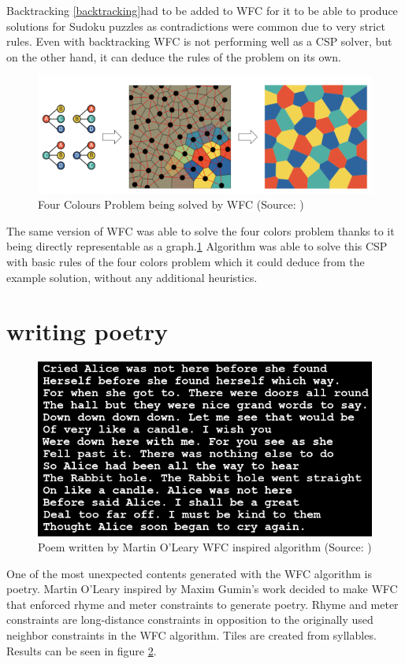 \documentclass[shortabstract, english, inz]{iithesis}
\begin{document}
Backtracking \ref{backtracking}had to be added to WFC for it to be able to produce solutions for Sudoku puzzles as contradictions were common due to very strict rules. Even with backtracking WFC is not performing well as a CSP solver, but on the other hand, it can deduce the rules of the problem on its own.\cite{GraphBased}
\begin{figure}[H]
\centering
\includegraphics[width=1\textwidth, angle=0]{images/fourcolours.png}
\caption{Four Colours Problem being solved by WFC (Source: \cite{GraphBased})}
\label{fig:fourcolours}
\end{figure}
The same version of WFC was able to solve the four colors problem thanks to it being directly representable as a graph.\ref{fig:fourcolours} Algorithm was able to solve this CSP with basic rules of the four colors problem which it could deduce from the example solution, without any additional heuristics.\cite{GraphBased}


\section{writing poetry}
\begin{figure}[H]
\centering
\includegraphics[width=1\textwidth, angle=0]{images/poem.png}
\caption{Poem written by Martin O’Leary WFC inspired algorithm (Source: \cite{wfcpoem})}
\label{fig:poem}
\end{figure}
One of the most unexpected contents generated with the WFC algorithm is poetry. Martin O’Leary inspired by Maxim Gumin's work decided to make WFC that enforced rhyme and meter constraints to generate poetry. Rhyme and meter constraints are long-distance constraints in opposition to the originally used neighbor constraints in the WFC algorithm. Tiles are created from syllables. Results can be seen in figure \ref{fig:poem}.\cite{Smith, wfcpoem}
\end{document}
